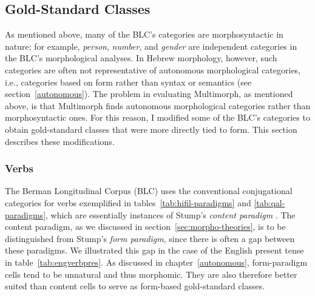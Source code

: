 {\subsection{Gold-Standard Classes}
\label{sec:gld-std-classes}
As mentioned above, many of the BLC's categories are morphosyntactic in nature; for example, \emph{person}, \emph{number}, and \emph{gender} are independent categories in the BLC's morphological analyses. In Hebrew morphology, however, such categories are often not representative of autonomous morphological categories, i.e., categories based on form rather than syntax or semantics (see section~\ref{autonomous}). The problem in evaluating Multimorph, as mentioned above, is that Multimorph finds autonomous morphological categories rather than morphosyntactic ones. For this reason, I modified some of the BLC's categories to obtain gold-standard classes that were more directly tied to form. This section describes these modifications.  

\subsubsection{Verbs} 

 The Berman Longitudinal Corpus (BLC) uses the conventional conjugational categories for verbs exemplified in  
 tables~\ref{tab:hifil-paradigms} and \ref{tab:qal-paradigms}, 
 which are essentially instances of Stump's \emph{content paradigm} \citep{stump:2001}. The content paradigm, as we discussed in section~\ref{sec:morpho-theories}, is to be distinguished from Stump's \emph{form paradigm}, since there is often a gap between these paradigms. We illustrated this gap in the case of the English present tense in table~\ref{tab:engverbpres}. As discussed in chapter~\ref{autonomous}, form-paradigm cells tend to be unnatural and thus morphomic. They are also therefore better suited than content cells to serve as form-based gold-standard classes. 

}
